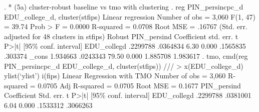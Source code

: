 . * (5a) cluster-robust baseline vs tmo with clustering
. reg PIN_persincpc_d EDU_college_d, cluster(stfips)
{\smallskip}
Linear regression                               Number of obs     =      3,060
                                                F(1, 47)          =      39.74
                                                Prob > F          =     0.0000
                                                R-squared         =     0.0708
                                                Root MSE          =     .16767
{\smallskip}
                                (Std. err. adjusted for 48 clusters in stfips)
             {\VBAR}               Robust
PIN_persin{\tytilde}d {\VBAR} Coefficient  std. err.      t    P>|t|     [95\% conf. interval]
EDU_colleg{\tytilde}d {\VBAR}   .2299788   .0364834     6.30   0.000     .1565835     .303374
       _cons {\VBAR}   1.934663   .0243343    79.50   0.000     1.885708    1.983617
{\smallskip}
. tmo, cmd(reg PIN_persincpc_d EDU_college_d, cluster(stfips)) ///
>     x(EDU_college_d) ylist(`ylist') i(fips)
{\smallskip}
Linear Regression with TMO                              Number of obs =  3,060
                                                        R-squared     = 0.0705
                                                        Adj R-squared = 0.0705
                                                        Root MSE      = 0.1677
{\smallskip}
PIN_persin{\tytilde}d {\VBAR} Coefficient  Std. err.      t    P>|t|     [95\% conf. interval]
EDU_colleg{\tytilde}d {\VBAR}   .2299788   .0381001     6.04   0.000     .1533312    .3066263
                                                                               
